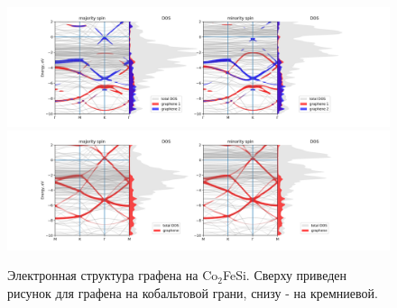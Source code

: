 \documentclass[]{article}
\begin{document}
\begin{figure}[h]
    \centering
    \includegraphics[scale=0.5]{images/co2fesi-graphene00000-100920.png}
    \includegraphics[scale=0.5]{images/co2fesi-graphene-sico2-080920.png}
    \caption{Электронная структура графена на Co$_2$FeSi. Сверху приведен рисунок для графена на кобальтовой грани, снизу - на кремниевой.}
    \label{fig:bands-graphene-cofe}
\end{figure}
\end{document}
